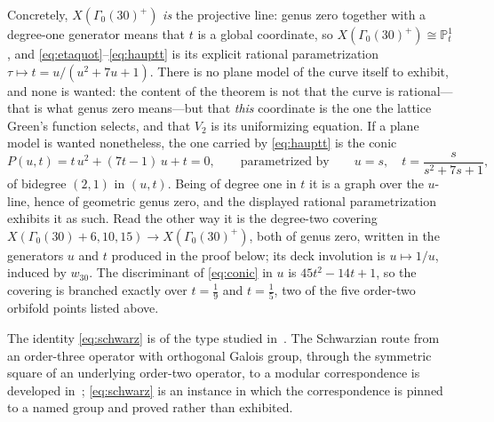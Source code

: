 \documentclass[cntp]{ipart}
\theoremstyle{plain}
\theoremstyle{remark}
\begin{document}
Concretely, $X(\Gamma_0(30)^+)$ \emph{is} the projective line: genus zero together with a
degree-one generator means that $t$ is a global coordinate, so
$X(\Gamma_0(30)^+)\cong\mathbb{P}^1_t$, and \eqref{eq:etaquot}--\eqref{eq:hauptt} is its explicit
rational parametrization $\tau\mapsto t=u/(u^2+7u+1)$. There is no plane model of the curve itself
to exhibit, and none is wanted: the content of the theorem is not that the curve is
rational---that is what genus zero means---but that \emph{this} coordinate is the one the lattice
Green's function selects, and that $V_2$ is its uniformizing equation. If a plane model is wanted
nonetheless, the one carried by \eqref{eq:hauptt} is the conic
\begin{equation}
P(u,t)=t\,u^{2}+(7t-1)\,u+t=0,
\qquad\text{parametrized by}\qquad
u=s,\quad t=\frac{s}{s^{2}+7s+1},
\label{eq:conic}
\end{equation}
of bidegree $(2,1)$ in $(u,t)$. Being of degree one in $t$ it is a graph over the $u$-line, hence
of geometric genus zero, and the displayed rational parametrization exhibits it as such. Read the
other way it is the degree-two covering
$X(\Gamma_0(30){+}6,10,15)\to X(\Gamma_0(30)^+)$, both of genus zero, written in the generators
$u$ and $t$ produced in the proof below; its deck involution is $u\mapsto1/u$, induced by
$w_{30}$. The discriminant of \eqref{eq:conic} in $u$ is $45t^2-14t+1$, so the covering is
branched exactly over $t=\tfrac19$ and $t=\tfrac15$, two of the five order-two orbifold points
listed above.

The identity \eqref{eq:schwarz} is of the type
studied in~\cite{AbdelazizMaillard2017,AbdelazizMaillard2017b}. The Schwarzian route from an
order-three operator with orthogonal Galois group, through the symmetric square of an underlying
order-two operator, to a modular correspondence is developed
in~\cite{AbdelazizMaillard2017,AbdelazizMaillard2017b}; \eqref{eq:schwarz} is an instance in
which the correspondence is pinned to a named group and proved rather than exhibited.
\end{document}
